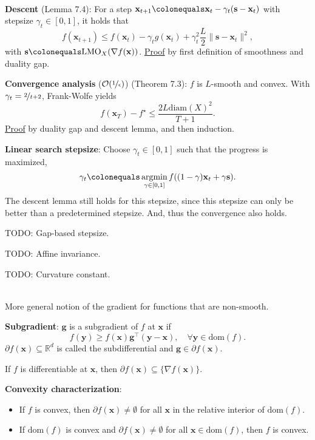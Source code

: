 \documentclass{article}
\DeclareMathOperator*{\argmin}{argmin}
\newcommand{\R}{\mathbb{R}}
\renewcommand{\vec}[1]{\mathbf{#1}}
\newcommand{\transpose}[1]{#1^\top}
\newcommand{\dom}[1]{\mathrm{dom}(#1)}
\newenvironment{topic}[1]
{\textbf{\sffamily \colorbox{black}{\rlap{\textbf{\textcolor{white}{#1}}}\hspace{\linewidth}\hspace{-2\fboxsep}}} \\ \vspace{0.2cm}}
{}
\begin{document}
\begin{multicols*}{2}
\begin{topic}{7 The Frank-Wolfe algorithm}
        \textbf{Descent} (Lemma 7.4): For a step $\vec{x}_{t+1} \colonequals \vec{x}_t - \gamma_t (\vec{s} - \vec{x}_t)$ with stepsize $\gamma_t \in [0,1]$, it holds that \[
            f(\vec{x}_{t+1}) \leq f(\vec{x}_t) - \gamma_t g(\vec{x}_t) + \gamma_t^2 \frac{L}{2} \| \vec{s} - \vec{x}_t \|^2,
        \]
        with $\vec{s} \colonequals \mathrm{LMO}_X(\nabla f(\vec{x}))$. \underline{Proof} by first
        definition of smoothness and duality gap.

        \textbf{Convergence analysis} ($\mathcal{O}(\nicefrac{1}{\epsilon})$) (Theorem 7.3): $f$ is $L$-smooth and convex. With $\gamma_t = \nicefrac{2}{t+2}$, Frank-Wolfe yields \[
            f(\vec{x}_T) - f^\star \leq \frac{2L \mathrm{diam}(X)^2}{T+1}.
        \]
        \underline{Proof} by duality gap and descent lemma, and then induction.

        \textbf{Linear search stepsize}: Choose $\gamma_t \in [0,1]$ such that the progress is maximized, \[
            \gamma_t \colonequals \argmin_{\gamma \in [0,1]} f((1-\gamma) \vec{x}_t + \gamma \vec{s}).
        \]
        The descent lemma still holds for this stepsize, since this stepsize can only be better than a
        predetermined stepsize. And, thus the convergence also holds.

        TODO: Gap-based stepsize.

        TODO: Affine invariance.

        TODO: Curvature constant.

    \end{topic}

    \begin{topic}{Subgradient method}
        More general notion of the gradient for functions that are non-smooth.

        \textbf{Subgradient}: $\vec{g}$ is a subgradient of $f$ at $\vec{x}$ if \[
            f(\vec{y}) \geq f(\vec{x}) \transpose{\vec{g}} (\vec{y} - \vec{x}), \quad \forall \vec{y} \in \dom{f}.
        \]
        $\partial f(\vec{x}) \subseteq \R^d$ is called the subdifferential and $\vec{g} \in \partial f(\vec{x})$.

        If $f$ is differentiable at $\vec{x}$, then $\partial f(\vec{x}) \subseteq \{ \nabla f(\vec{x})
            \}$.

        \textbf{Convexity characterization}:
        \begin{itemize}
            \item If $f$ is convex, then $\partial f(\vec{x}) \neq \emptyset$ for all $\vec{x}$ in the relative
                  interior of $\dom{f}$.
            \item If $\dom{f}$ is convex and $\partial f(\vec{x}) \neq \emptyset$ for all $\vec{x} \in \dom{f}$, then
                  $f$ is convex.
        \end{itemize}


\end{topic}
\end{multicols*}
\end{document}
